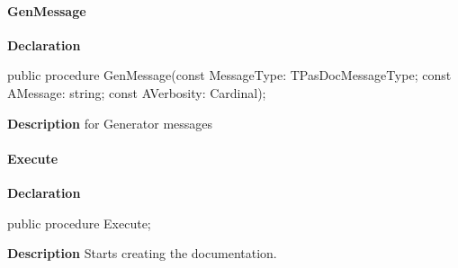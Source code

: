 \documentclass{report}
\newif\ifpdf
\begin{document}
\paragraph*{GenMessage}\hspace*{\fill}

\label{PasDoc_Base.TPasDoc-GenMessage}
\begin{list}{}{
\setlength{\itemindent}{0cm}
\setlength{\listparindent}{0cm}
\setlength{\leftmargin}{\evensidemargin}
\addtolength{\leftmargin}{\tmplength}
\settowidth{\labelsep}{X}
\addtolength{\leftmargin}{\labelsep}
\setlength{\labelwidth}{\tmplength}
}
\item[\textbf{Declaration}\hfill]
\ifpdf
\begin{flushleft}
\fi
\begin{ttfamily}
public procedure GenMessage(const MessageType: TPasDocMessageType; const AMessage: string; const AVerbosity: Cardinal);\end{ttfamily}

\ifpdf
\end{flushleft}
\fi

\par
\item[\textbf{Description}]
for Generator messages

\end{list}
\paragraph*{Execute}\hspace*{\fill}

\label{PasDoc_Base.TPasDoc-Execute}
\begin{list}{}{
\setlength{\itemindent}{0cm}
\setlength{\listparindent}{0cm}
\setlength{\leftmargin}{\evensidemargin}
\addtolength{\leftmargin}{\tmplength}
\settowidth{\labelsep}{X}
\addtolength{\leftmargin}{\labelsep}
\setlength{\labelwidth}{\tmplength}
}
\item[\textbf{Declaration}\hfill]
\ifpdf
\begin{flushleft}
\fi
\begin{ttfamily}
public procedure Execute;\end{ttfamily}

\ifpdf
\end{flushleft}
\fi

\par
\item[\textbf{Description}]
Starts creating the documentation.

\end{list}
\end{document}
